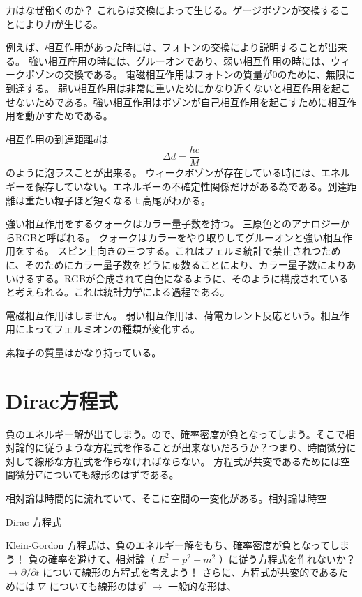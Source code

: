 \documentclass[titlepage]{ltjsarticle}
\begin{document}
力はなぜ働くのか？
これらは交換によって生じる。ゲージボゾンが交換することにより力が生じる。

例えば、相互作用があった時には、フォトンの交換により説明することが出来る。
強い相互座用の時には、グルーオンであり、弱い相互作用の時には、ウィークボゾンの交換である。
電磁相互作用はフォトンの質量が0のために、無限に到達する。
弱い相互作用は非常に重いためにかなり近くないと相互作用を起こせないためである。強い相互作用はボゾンが自己相互作用を起こすために相互作用を動かすためである。

相互作用の到達距離\(d\)は
\begin{equation}
  \Delta d =  \frac{hc}{M}
\end{equation}
のように泡ラスことが出来る。
ウィークボゾンが存在している時には、エネルギーを保存していない。エネルギーの不確定性関係だけがある為である。到達距離は重たい粒子ほど短くなるｔ高尾がわかる。


強い相互作用をするクォークはカラー量子数を持つ。
三原色とのアナロジーからRGBと呼ばれる。
クォークはカラーをやり取りしてグルーオンと強い相互作用をする。
スピン上向きの三つする。これはフェルミ統計で禁止されつために、そのためにカラー量子数をどうにゅ数ることにより、カラー量子数によりあいけるする。RGBが合成されて白色になるように、そのように構成されていると考えられる。これは統計力学による過程である。

電磁相互作用はしません。
弱い相互作用は、荷電カレント反応という。相互作用によってフェルミオンの種類が変化する。

素粒子の質量はかなり持っている。


\section{Dirac方程式}
負のエネルギー解が出てしまう。ので、確率密度が負となってしまう。そこで相対論的に従うような方程式を作ることが出来ないだろうか？つまり、時間微分に対して線形な方程式を作らなければならない。
方程式が共変であるためには空間微分\(\nabla\)についても線形のはずである。

相対論は時間的に流れていて、そこに空間の一変化がある。相対論は時空


Dirac 方程式

Klein-Gordon 方程式は、負のエネルギー解をもち、確率密度が負となってしまう！
負の確率を避けて、相対論（ \(E^2=p^2+m^2\) ）に従う方程式を作れないか？
\(\rightarrow \partial / \partial t\) について線形の方程式を考えよう！
さらに、方程式が共変的であるためには \(\nabla\) についても線形のはず
\(\rightarrow\) 一般的な形は、
\end{document}
